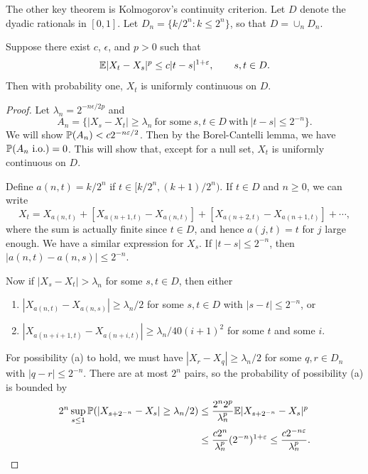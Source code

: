 
The other key theorem is Kolmogorov's continuity criterion. Let $D$ denote the dyadic rationals in $[0,1]$. Let $D_n = \{k/2^n : k \leq 2^n\}$, so that $D = \cup_n D_n$.

\begin{theorem}\label{thm:ch1_3.11}
Suppose there exist $c$, $\epsilon$, and $p > 0$ such that
\[
    \E|X_t - X_s|^p \leq c|t - s|^{1+\epsilon}, \qquad s,t \in D.
\]
Then with probability one, $X_t$ is uniformly continuous on $D$.
\end{theorem}

\begin{proof}
Let $\lambda_n = 2^{-n\epsilon/2p}$ and
\[
    A_n = \{|X_s - X_t| \geq \lambda_n~\text{for some}~s,t \in D~\text{with}~|t - s| \leq 2^{-n}\}.
\]
We will show $\P(A_n) < c2^{-n\epsilon/2}$. Then by the Borel-Cantelli lemma, we have $\P(A_n~\text{i.o.}) = 0$. This will show that, except for a null set, $X_t$ is uniformly continuous on $D$.

Define $a(n,t) = k/2^n$ if $t \in [k/2^n,(k+1)/2^n)$. If $t \in D$ and $n \geq 0$, we can write
\[
    X_t = X_{a(n,t)} + [X_{a(n+1,t)} - X_{a(n,t)}] + [X_{a(n+2,t)} - X_{a(n+1,t)}] + \cdots,
\]
where the sum is actually finite since $t \in D$, and hence $a(j,t) = t$ for $j$ large enough. We have a similar expression for $X_s$. If $|t - s| \leq 2^{-n}$, then $|a(n,t) - a(n,s)| \leq 2^{-n}$.

Now if $|X_s - X_t| > \lambda_n$ for some $s,t \in D$, then either
\begin{enumerate}
    \item $|X_{a(n,t)} - X_{a(n,s)}| \geq \lambda_n/2$ for some $s,t \in D$ with $|s - t| \leq 2^{-n}$, or
    \item $|X_{a(n+i+1,t)} - X_{a(n+i,t)}| \geq \lambda_n/40(i+1)^2$ for some $t$ and some $i$.
\end{enumerate}

\mpagebreak

For possibility (a) to hold, we must have $|X_r - X_q| \geq \lambda_n/2$ for some $q,r \in D_n$ with $|q-r| \leq 2^{-n}$. There are at most $2^n$ pairs, so the probability of possibility (a) is bounded by
\begin{align*}
    2^n \sup_{s\leq 1}\P(|X_{s+2^{-n}} - X_s| \geq \lambda_n/2) &\leq \frac{2^n2^p}{\lambda_n^p} \E|X_{s+2^{-n}} - X_s|^p \\
    &\leq \frac{c2^n}{{\lambda_n^p}}(2^{-n})^{1+\epsilon} \leq \frac{c2^{-n\epsilon}}{\lambda_n^p}.
\end{align*}


\end{proof}
